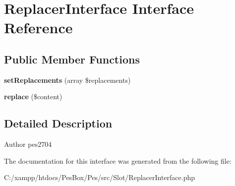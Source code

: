 \hypertarget{interface_pes_1_1_slot_1_1_replacer_interface}{}\section{Replacer\+Interface Interface Reference}
\label{interface_pes_1_1_slot_1_1_replacer_interface}
\subsection*{Public Member Functions}
\begin{DoxyCompactItemize}
\item 
\mbox{\label{interface_pes_1_1_slot_1_1_replacer_interface_a1105298416788f74d0c696669ccf8d17}} 
{\bfseries set\+Replacements} (array \$replacements)
\item 
\mbox{\label{interface_pes_1_1_slot_1_1_replacer_interface_a019bce9449986aa11411064c8f9e02c2}} 
{\bfseries replace} (\$content)
\end{DoxyCompactItemize}


\subsection{Detailed Description}
\begin{DoxyAuthor}{Author}
pes2704 
\end{DoxyAuthor}


The documentation for this interface was generated from the following file\+:\begin{DoxyCompactItemize}
\item 
C\+:/xampp/htdocs/\+Pes\+Box/\+Pes/src/\+Slot/Replacer\+Interface.\+php\end{DoxyCompactItemize}
